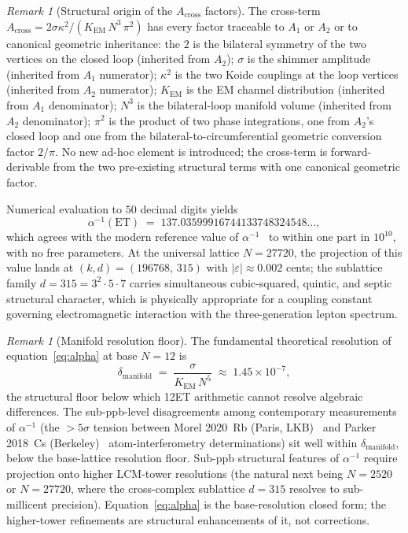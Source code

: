 \documentclass[11pt,a4paper]{article}
\theoremstyle{definition}
\theoremstyle{remark}
\newtheorem{remark}[theorem]{Remark}
\newcommand{\eps}{\varepsilon}
\begin{document}
\begin{remark}[Structural origin of the $A_{\mathrm{cross}}$ factors]\label{rem:Across-factors}
The cross-term $A_{\mathrm{cross}} = 2\sigma\kappa^{2}/(K_{\mathrm{EM}}\,N^{3}\,\pi^{2})$ has every factor traceable to $A_{1}$ or $A_{2}$ or to canonical geometric inheritance: the $2$ is the bilateral symmetry of the two vertices on the closed loop (inherited from $A_{2}$); $\sigma$ is the shimmer amplitude (inherited from $A_{1}$ numerator); $\kappa^{2}$ is the two Koide couplings at the loop vertices (inherited from $A_{2}$ numerator); $K_{\mathrm{EM}}$ is the EM channel distribution (inherited from $A_{1}$ denominator); $N^{3}$ is the bilateral-loop manifold volume (inherited from $A_{2}$ denominator); $\pi^{2}$ is the product of two phase integrations, one from $A_{2}$'s closed loop and one from the bilateral-to-circumferential geometric conversion factor $2/\pi$. No new ad-hoc element is introduced; the cross-term is forward-derivable from the two pre-existing structural terms with one canonical geometric factor.
\end{remark}

Numerical evaluation to $50$ decimal digits yields
\[
\alpha^{-1}(\mathrm{ET}) \;=\; 137.03599916744133748324548\ldots,
\]
which agrees with the modern reference value of $\alpha^{-1}$~\cite{LatComp2025} to within one part in $10^{10}$, with no free parameters. At the universal lattice $N=27720$, the projection of this value lands at $(k,d)=(196768,\,315)$ with $|\eps|\approx 0.002$ cents; the sublattice family $d=315 = 3^{2}\cdot 5\cdot 7$ carries simultaneous cubic-squared, quintic, and septic structural character, which is physically appropriate for a coupling constant governing electromagnetic interaction with the three-generation lepton spectrum.

\begin{remark}[Manifold resolution floor]\label{rem:alpha-resolution-floor}
The fundamental theoretical resolution of equation~\eqref{eq:alpha} at base $N=12$ is
\[
\delta_{\mathrm{manifold}} \;=\; \frac{\sigma}{K_{\mathrm{EM}}\,N^{5}} \;\approx\; 1.45\times 10^{-7},
\]
the structural floor below which 12ET arithmetic cannot resolve algebraic differences. The sub-ppb-level disagreements among contemporary measurements of $\alpha^{-1}$ (the $>5\sigma$ tension between Morel 2020~Rb (Paris, LKB)~\cite{Morel2020} and Parker 2018~Cs (Berkeley)~\cite{Parker2018} atom-interferometry determinations) sit well within $\delta_{\mathrm{manifold}}$, below the base-lattice resolution floor. Sub-ppb structural features of $\alpha^{-1}$ require projection onto higher LCM-tower resolutions (the natural next being $N=2520$ or $N=27720$, where the cross-complex sublattice $d=315$ resolves to sub-millicent precision). Equation~\eqref{eq:alpha} is the base-resolution closed form; the higher-tower refinements are structural enhancements of it, not corrections.
\end{remark}
\end{document}
